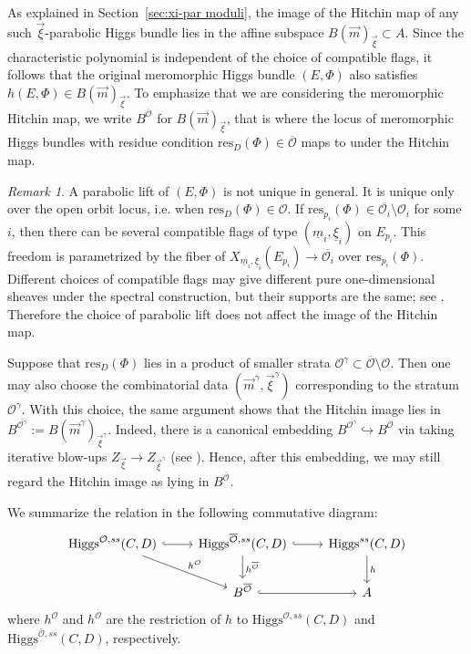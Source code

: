 \documentclass[11pt]{amsart}
\theoremstyle{plain}
\theoremstyle{definition}
\theoremstyle{remark}
\newtheorem{remark}[theorem]{Remark}
\newcommand{\ov}[1]{\overline{#1}}
\newcommand{\cO}{\mathcal O}
\newcommand{\Higgs}{\mathrm{Higgs}}
\def\res{\mathrm{res}}
\def\uxi{{\underline{\xi}}}
\def\vxi{\vec{\xi}}
\def\vm{\vec{m}}
\def\um{{\underline{m}}}
\begin{document}
As explained in Section~\ref{sec:xi-par moduli}, the image of the Hitchin map of any such $\vec\xi$-parabolic Higgs bundle lies in the affine subspace $B(\vec m)_{\vec\xi}\subset A$. Since the characteristic polynomial is independent of the choice of compatible flags, it follows that the original meromorphic Higgs bundle $(E,\Phi)$ also satisfies $h(E,\Phi)\in B(\vec m)_{\vec\xi}$. To emphasize that we are considering the meromorphic Hitchin map, we write $B^{\ov\cO}$ for $B(\vm)_{\vxi}$, that is where the locus of meromorphic Higgs bundles with residue condition $\res_D(\Phi)\in\overline{\mathcal O}$ maps to under the Hitchin map. 

\begin{remark}
    A parabolic lift of $(E,\Phi)$ is not unique in general. It is unique only over the open orbit locus, i.e. when $\res_D(\Phi)\in\mathcal O$. If $\res_{p_i}(\Phi)\in\overline{\mathcal O_i}\setminus\mathcal O_i$ for some $i$, then there can be several compatible flags of type $(\um_i,\uxi_i)$ on $E_{p_i}$. This freedom is parametrized by the fiber of
$X_{\um_i,\uxi_i}(E_{p_i})\to\overline{\mathcal O_i}$
over $\res_{p_i}(\Phi)$. Different choices of compatible flags may give different pure one-dimensional sheaves under the spectral construction, but their supports are the same; see \cite[Remark 4.11]{LeeLee2025}. Therefore the choice of parabolic lift does not affect the image of the Hitchin map.

Suppose that $\res_D(\Phi)$ lies in a product of smaller strata $\mathcal O^\gamma\subset\overline{\mathcal O}\setminus\mathcal O$. Then one may also choose the combinatorial data $(\vec m^\gamma,\vec\xi^\gamma)$ corresponding to the stratum $\mathcal O^\gamma$. With this choice, the same argument shows that the Hitchin image lies in $B^{\ov{\cO^\gamma}}:=B(\vec m^\gamma)_{\vec\xi^\gamma}$. Indeed, there is a canonical embedding
$B^{\ov{\cO^\gamma}} \hookrightarrow B^{\ov\cO}$
via taking iterative blow-ups $Z_{\vec\xi} \to Z_{\vec\xi^\gamma}$ (see \cite[Section 3.2]{LeeLee2025}). Hence, after this embedding, we may still regard the Hitchin image as lying in $B^{\ov\cO}$.
\end{remark}
   
\noindent We summarize the relation in the following commutative diagram:
\[
\begin{tikzcd}
    \Higgs^{\cO,ss}(C,D) \arrow[r, hook] \arrow[rd, "h^{\cO}"]&\Higgs^{\ov\cO, ss}(C,D) \arrow[r, hook] \arrow[d, "h^{\ov\cO}"] & \Higgs^{ss}(C,D) \arrow[d, "h"] \\
     &B^{\ov\cO} \arrow[r,hook] & A
\end{tikzcd}
\]
where $h^{\cO}$ and $h^{\ov\cO}$ are the restriction of $h$ to $\Higgs^{\cO,ss}(C,D)$ and $\Higgs^{\ov\cO,ss}(C,D)$, respectively. 
\end{document}
